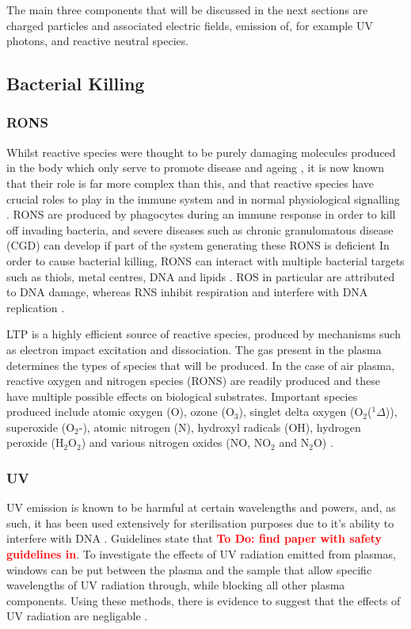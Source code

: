 \documentclass[11pt, oneside]{article}   	%
\newcommand{\todo}[1]{ \textcolor{red}{\bf{To Do:} #1}}
\begin{document}
The main three components that will be discussed in the next sections are charged particles and associated electric fields, emission of, for example UV photons, and reactive neutral species.


\subsection{Bacterial Killing}
\subsubsection{RONS}
Whilst reactive species were thought to be purely damaging molecules produced in the body which only serve to promote disease and ageing \cite{Harman1955aging}, it is now known that their role is far more complex than this, and that reactive species have crucial roles to play in the immune system and in normal physiological signalling \cite{Thannickal2000reactive}.
RONS are produced by phagocytes during an immune response in order to kill off invading bacteria, and severe diseases such as chronic granulomatous disease (CGD) can develop if part of the system generating these RONS is deficient \cite{Fang2004antimicrobial}
In order to cause bacterial killing, RONS can interact with multiple bacterial targets such as thiols, metal centres, DNA and lipids \cite{Fang2004antimicrobial}.
ROS in particular are attributed to DNA damage, whereas RNS inhibit respiration and interfere with DNA replication \cite{Fang2004antimicrobial}.

LTP is a highly efficient source of reactive species, produced by mechanisms such as electron impact excitation and dissociation.
The gas present in the plasma determines the types of species that will be produced. 
In the case of air plasma, reactive oxygen and nitrogen species (RONS) are readily produced and these have multiple possible effects on biological substrates.
Important species produced include atomic oxygen (O), ozone (O$_3$), singlet delta oxygen (O$_2$($^1\Delta$)), superoxide (O$_2$-), atomic nitrogen (N), hydroxyl radicals (OH), hydrogen peroxide (H$_2$O$_2$) and various nitrogen oxides (NO, NO$_2$ and N$_2$O) \cite{Graves2014low}.


\subsubsection{UV}
UV emission is known to be harmful at certain wavelengths and powers, and, as such, it has been used extensively for sterilisation purposes due to it's ability to interfere with DNA \cite{Laroussi2004evaluation}.
Guidelines state that \todo{find paper with safety guidelines in}.
To investigate the effects of UV radiation emitted from plasmas, windows can be put between the plasma and the sample that allow specific wavelengths of UV radiation through, while blocking all other plasma components. 
Using these methods, there is evidence to suggest that the effects of UV radiation are negligable \cite{Laroussi2004evaluation, Dobrynin2009physical}.
\end{document}
